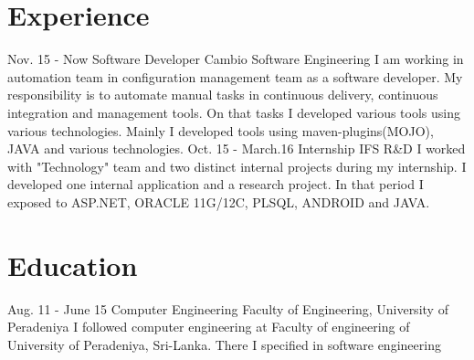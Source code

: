 \documentclass[]{cv-class}
\begin{document}
\section{Experience}
\begin{entrylist}
  \entry
    {Nov. 15 - Now}
    {Software Developer}
    {Cambio Software Engineering}
    {I am working in automation team in configuration management team as a software developer. My responsibility 
    is to automate manual tasks in continuous delivery, continuous integration and management tools. On that tasks
    I developed various tools using various technologies. Mainly I developed tools using maven-plugins(MOJO), JAVA 
    and various technologies.}
  \entry
    {Oct. 15 - March.16}
    {Internship}
    {IFS R\&D}
    {I worked with "Technology" team and two distinct internal projects during my internship. I developed one internal
	application and a research project. In that period I exposed to ASP.NET, ORACLE 11G/12C, PLSQL, ANDROID and JAVA.}
\end{entrylist}

\section{Education}
\begin{entrylist}
  \entry
    {Aug. 11 - June 15}
    {Computer Engineering}
    {Faculty of Engineering, University of Peradeniya}
    {I followed computer engineering at Faculty of engineering of University of Peradeniya, Sri-Lanka. There I specified in 			 software engineering}
\end{entrylist}
\end{document}
